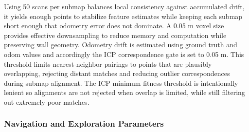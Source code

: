\documentclass[11pt]{article}
\begin{document}
Using 50 scans per submap balances local consistency against accumulated drift, it yields enough points to stabilize feature estimates while keeping each submap short enough that odometry error does not dominate. A 0.05 m voxel size provides effective downsampling to reduce memory and computation while preserving wall geometry. Odometry drift is estimated using ground truth and odom values and accordingly the ICP correspondence gate is set to 0.05 m. This threshold limits nearest-neighbor pairings to points that are plausibly overlapping, rejecting distant matches and reducing outlier correspondences during submap alignment. The ICP minimum fitness threshold is intentionally lenient so alignments are not rejected when overlap is limited, while still filtering out extremely poor matches.

\subsubsection{Navigation and Exploration Parameters}
\end{document}
